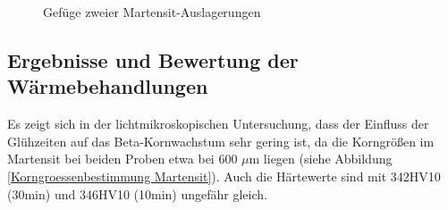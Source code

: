 \documentclass[a4paper, 11pt]{tubsreprt}
\begin{document}
\begin{figure}
\caption{Gefüge zweier Martensit-Auslagerungen}
\label{Gefuegestruktur zweier Martensit Auslageungen}
\end{figure}




\subsection{Ergebnisse und Bewertung der Wärmebehandlungen}
Es zeigt sich in der lichtmikroskopischen Untersuchung, dass der Einfluss der Glühzeiten auf das Beta-Kornwachstum sehr gering ist, da die Korngrößen im Martensit bei beiden Proben etwa bei 600 $\mu$m liegen (siehe Abbildung \ref{Korngroessenbestimmung Martensit}). Auch die Härtewerte sind mit 342HV10 (30min) und 346HV10 (10min) ungefähr gleich. 
\end{document}
